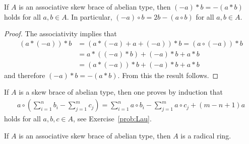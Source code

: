 \begin{lemma}\label{lem:CGIS}
    If $A$ is an associative skew brace of abelian type, then $(-a)*b=-(a*b)$ 
	holds for all $a,b\in A$. In particular, $(-a)\circ b=2b-(a\circ b)$ for all $a,b\in A$. 
\end{lemma}

\begin{proof}
    The associativity implies that 
 	\begin{align*}
 	    (a*(-a))*b &= 
 	    (a*(-a)+a+(-a))*b=(a\circ (-a))*b\\
 	    &=a*( (-a)*b)+(-a)*b+a*b\\
 	    &=(a*(-a))*b+(-a)*b+a*b
     \end{align*}
     and therefore $(-a)*b=-(a*b)$. From this the result follows. 
\end{proof}

If $A$ is a skew brace of abelian type, then one proves by induction that 
\begin{align}
\label{eq:Lau}
    a\circ \left(\sum_{i=1}^n b_i-\sum_{j=1}^mc_j\right)
    =\sum_{i=1}^n a\circ b_i-\sum_{j=1}^ma\circ c_j+(m-n+1)a
\end{align}
holds for all $a,b,c\in A$, see Exercise~\ref{prob:Lau}. 





\begin{theorem}
    \label{thm:Lau}
	If $A$ is an associative skew brace of abelian type, then $A$ is a radical ring. 
\end{theorem}

